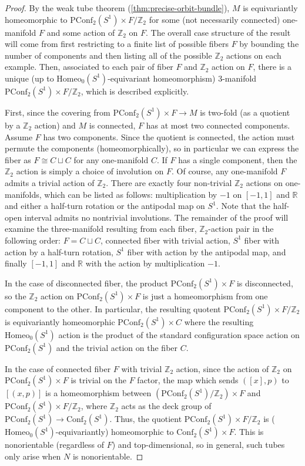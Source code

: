 \documentclass[10pt, oneside]{article}
\newcommand{\Z}{\mathbb{Z}}
\newcommand{\homeo}[1][S^1]{\text{Homeo}_0(#1)}
\newcommand{\conf}[2][S^1]{\text{Conf}_{#2}(#1)}
\newcommand{\pconf}[2][S^1]{\text{PConf}_{#2}(#1)}
\theoremstyle{definition}
\theoremstyle{definition}
\begin{document}
\begin{proof}
    By the weak tube theorem (\cref{thm:precise-orbit-bundle}), $M$ is equivariantly homeomorphic to $\pconf{2}\times F/\Z_2$ for some (not necessarily connected) one-manifold $F$ and some action of $\Z_2$ on $F$. The overall case structure of the result will come from first restricting to a finite list of possible fibers $F$ by bounding the number of components and then listing all of the possible $\Z_2$ actions on each example. Then, associated to each pair of fiber $F$ and $\Z_2$ action on $F$, there is a unique (up to $\homeo$-equivariant homeomorphism) 3-manifold $\pconf{2}\times F/\Z_2$, which is described explicitly.

    First, since the covering from $\pconf{2}\times F\to M$ is two-fold (as a quotient by a $\Z_2$ action) and $M$ is connected, $F$ has at most two connected components.
    Assume $F$ has two components.
    Since the quotient is connected,
    the action must permute the components (homeomorphically),
    so in particular we can express the fiber
    as $F\cong C\sqcup C$ for any one-manifold $C$.
    If $F$ has a single component,
    then the $\Z_2$ action is simply a choice of involution on $F$. Of course, any one-manifold $F$ admits a trivial action of $\Z_2$. There are exactly four non-trivial $\Z_2$ actions on one-manifolds, which can be listed as follows:
    multiplication by $-1$ on $[-1,1]$ and $\mathbb{R}$
    and either a half-turn rotation or the antipodal map on $S^1$. Note that the half-open interval admits no nontrivial involutions. The remainder of the proof will examine the three-manifold resulting from each fiber, $\Z_2$-action pair in the following order: $F=C\sqcup C$, connected fiber with trivial action, $S^1$ fiber with action by a half-turn rotation, $S^1$ fiber with action by the antipodal map, and finally $[-1,1]$ and $\mathbb{R}$ with the action by multiplication $-1$.


    In the case of disconnected fiber, the product $\pconf{2}\times F$ is disconnected, so the $\Z_2$ action on $\pconf{2}\times F$ is just a homeomorphism
    from one component to the other. In particular, the resulting quotent $\pconf{2}\times F/\Z_2$ is equivariantly homeomorphic $\pconf{2}\times C$
    where the resulting $\homeo$ action is the product of the standard configuration space action on $\pconf{2}$ and the trivial action on the fiber $C$.

    In the case of connected fiber $F$ with trivial $\Z_2$ action, since the action of $\Z_2$ on $\pconf{2}\times F$ is trivial on the $F$ factor,
    the map which sends $([x], p)$ to $[(x, p)]$ is a homeomorphism between $(\pconf{2}/\Z_2)\times F$ and $\pconf{2}\times F / \Z_2$,
    where $\Z_2$ acts as the deck group of $\pconf{2}\to\conf{2}$.
    Thus, the quotient $\pconf{2}\times F / \Z_2$ is ($\homeo$-equivariantly) homeomorphic to $\conf{2}\times F$.
    This is nonorientable (regardless of $F$) and top-dimensional,
    so in general,
    such tubes only arise when $N$ is nonorientable.
    

\end{proof}
\end{document}
